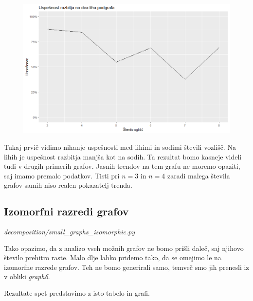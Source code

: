 \documentclass[12pt,a4paper]{amsart}
\theoremstyle{definition} %
\theoremstyle{plain} %
\begin{document}
\begin{figure}[h]
\centering
\includegraphics[width=1\textwidth]{images/sm_graph_success}
\end{figure}


Tukaj prvič vidimo nihanje uspešnosti med lihimi in sodimi števili vozlišč. Na lihih je uspešnost razbitja
manjša kot na sodih. Ta rezultat bomo kasneje videli tudi v drugih primerih grafov.
Jasnih trendov na tem grafu ne moremo opaziti, saj imamo premalo podatkov.
Tisti pri $n=3$ in $n=4$ zaradi malega števila grafov samih niso realen pokazatelj trenda.

\subsection{Izomorfni razredi grafov}
\emph{decomposition/small\_graphs\_isomorphic.py}

Tako opazimo, da z analizo vseh možnih grafov ne bomo prišli daleč, saj njihovo število prehitro raste.
Malo dlje lahko pridemo tako, da se omejimo le na izomorfne razrede grafov.
Teh ne bomo generirali samo, temveč smo jih prenesli iz \cite{isomorph} v obliki \emph{graph6}.

Rezultate spet predstavimo z isto tabelo in grafi.
\end{document}
